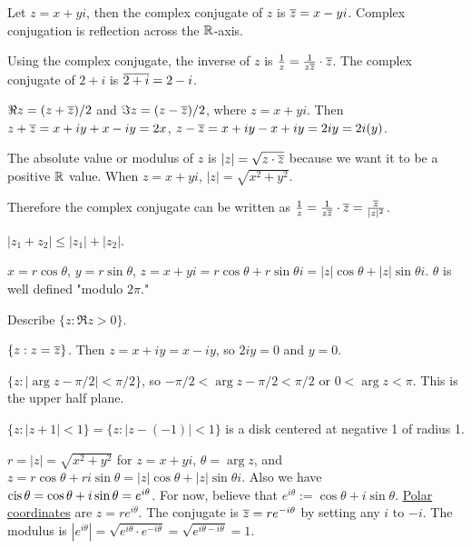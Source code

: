 \documentclass[]{article}
\begin{document}
\begin{definition}
	 Let $z=x+yi$, then the complex conjugate of $z$ is $\overline{z}=x-yi$. Complex conjugation is reflection across the $\mathbb{R}$-axis.
\end{definition}
Using the complex conjugate, the inverse of $z$ is $\frac{1}{z}=\frac{1}{z\overline{z}}\cdot \overline{z}$. The complex conjugate of $2+i$ is $\overline{2+i}=2-i$.
\begin{definition}
	$\Re{z}=(z+\overline{z})/2$ and $\Im{z}=(z-\overline{z})/2$, where $z=x+yi$. Then $z+\overline{z}=x+iy+x-iy=2x$, $z-\overline{z}=x+iy-x+iy=2iy=2i(y)$.
\end{definition}
\begin{definition}
	 The absolute value or modulus of $z$ is $|z|=\sqrt{z\cdot\overline{z}}$ because we want it to be a positive $\mathbb{R}$ value. When $z=x+yi$, $|z|=\sqrt{x^2+y^2}$.
\end{definition}
Therefore the complex conjugate can be written as $\frac{1}{z}=\frac{1}{z\overline{z}}\cdot\overline{z}=\frac{\overline{z}}{|z|^2}$.

\begin{definition}
	 $|z_1+z_2|\leq|z_1|+|z_2|$.
\end{definition}

$x=r\cos{\theta}$, $y=r\sin{\theta}$, $z=x+yi=r\cos{\theta}+r\sin{\theta}i=|z|\cos{\theta}+|z|\sin{\theta}i$. $\theta$ is well defined "modulo $2\pi$."

\begin{example}
	Describe $\{z:\Re{z}>0\}$.
\end{example}
\begin{example}
	$\{z:z=\overline{z}\}$. Then $z=x+iy=x-iy$, so $2iy=0$ and $y=0$.
\end{example}
\begin{example}
	$\{z: |\arg{z}-\pi/2| < \pi/2\}$, so $-\pi/2<\arg{z}-\pi/2<\pi/2$ or $0<\arg{z}<\pi$. This is the upper half plane.
\end{example}
\begin{example}
	$\{z: |z+1|<1 \}=\{z: |z-(-1)|<1\}$ is a disk centered at negative 1 of radius 1.
\end{example}
\begin{definition}
	$r=|z|=\sqrt{x^2+y^2}$ for $z=x+yi$, $\theta=\arg{z}$, and $z=r\cos{\theta}+ri\sin{\theta}=|z|\cos\theta+|z|\sin\theta i$.
	Also we have $\operatorname{cis}{\theta}=\cos\theta+i\sin\theta=e^{i\theta}$.
	For now, believe that $e^{i\theta}:=\cos\theta + i\sin\theta$. \underline{Polar coordinates} are $z=re^{i\theta}$. The conjugate is $\overline{z}=re^{-i\theta}$ by setting any $i$ to $-i$. The modulus is $|e^{i\theta}|=\sqrt{e^{i\theta}\cdot e^{-i\theta}}=\sqrt{e^{i\theta-i\theta}}=1$.	
\end{definition}
\end{document}
